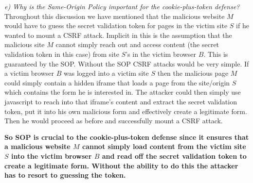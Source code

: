 \noindent \textit{e) Why is the Same-Origin Policy important for the cookie-plus-token defense?}\\

Throughout this discussion we have mentioned that the malicious website $M$ would have to guess the secret validation token for pages in the victim site $S$ if he wanted to mount a CSRF attack. Implicit in this is the assumption that the malicious site $M$ cannot simply reach out and access content (the secret validation token in this case) from site $S$'s in the victim browser $B$. This is guaranteed by the SOP. Without the SOP CSRF attacks would be very simple. If a victim browser $B$ was logged into a victim site $S$ then the malicious page $M$ could simply contain a hidden iframe that loads a page from the site/origin $S$ which contains the form he is interested in. The attacker could then simply use javascript to reach into that iframe's content and extract the secret validation token, put it into his own malicious form and effectively create a legitimate form. Then he would proceed as before and successfully mount a CSRF attack. 

\textbf{So SOP is crucial to the cookie-plus-token defense since it ensures that a malicious website $M$ cannot simply load content from the victim site $S$ into the victim browser $B$ and read off the secret validation token to create a legitimate form. Without the ability to do this the attacker has to resort to guessing the token.} 
